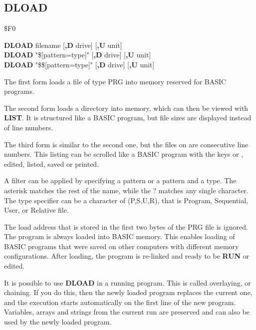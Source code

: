 \subsection{DLOAD}
\begin{description}[leftmargin=2cm,style=nextline]
\item [Token:] \$F0
\item [Format:] {\bf DLOAD} filename [{\bf,D} drive] [{\bf,U} unit] \\
                {\bf DLOAD} "\$[pattern=type]" [{\bf,D} drive] [{\bf,U} unit] \\
                {\bf DLOAD} "\$\$[pattern=type]" [{\bf,D} drive] [{\bf,U} unit]

\item [Usage:] The first form loads a file of type
   PRG into memory reserved for BASIC programs.

The second form loads a directory into memory, which can then be viewed with
{\bf LIST}. It is structured like a BASIC program, but file sizes are
displayed instead of line numbers.

The third form is similar to the second one, but the files on are consecutive
line numbers. This listing can be scrolled like a BASIC program with the keys
 or , edited, listed, saved or printed.

A filter can be applied by specifying a pattern or a pattern and a type.
The asterisk \* matches the rest of the name, while the ? matches any single character.
The type specifier can be a character of (P,S,U,R), that is Program, Sequential, User,
or Relative file.

   \filenamedefinition

   \drivedefinition

   \unitdefinition

\item [Remarks:]
   The load address that is stored in the first two bytes
   of the PRG file is ignored. The program is always loaded into
   BASIC memory. This enables loading of BASIC programs
   that were saved on other computers with different memory
   configurations. After loading, the program is re-linked
   and ready to be {\bf RUN} or edited.

   It is possible to use {\bf DLOAD} in a running program. This is
   called overlaying, or chaining.
   If you do this, then the newly loaded program replaces the current one,
   and the execution starts automatically on the first line of the
   new program. Variables, arrays and strings from the current
   run are preserved and can also be used by the newly loaded program.


\end{description}
